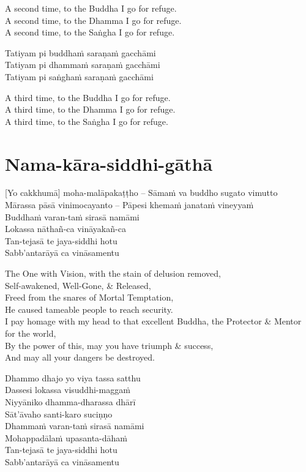 \begin{english-verses}
  A second time, to the Buddha I go for refuge.\\
  A second time, to the Dhamma I go for refuge.\\
  A second time, to the Saṅgha I go for refuge.
\end{english-verses}

Tatiyam pi buddhaṁ saraṇaṁ gacchāmi\\
Tatiyam pi dhammaṁ saraṇaṁ gacchāmi\\
Tatiyam pi saṅghaṁ saraṇaṁ gacchāmi

\begin{english-verses}
  A third time, to the Buddha I go for refuge.\\
  A third time, to the Dhamma I go for refuge.\\
  A third time, to the Saṅgha I go for refuge.
\end{english-verses}

\section{Nama-kāra-siddhi-gāthā}
\label{nama-kara-siddhi-gatha}
[Yo cakkhumā] moha-malāpakaṭṭho – Sāmaṁ va buddho sugato vimutto\\
Mārassa pāsā vinimocayanto – Pāpesi khemaṁ janataṁ vineyyaṁ\\
Buddhaṁ varan-taṁ sirasā namāmi\\
Lokassa nāthañ-ca vināyakañ-ca\\
Tan-tejasā te jaya-siddhi hotu\\
Sabb'antarāyā ca vināsamentu

\begin{english}
  The One with Vision, with the stain of delusion removed,\\
  Self-awakened, Well-Gone, \& Released,\\
  Freed from the snares of Mortal Temptation,\\
  He caused tameable people to reach security.\\
  I pay homage with my head to that excellent Buddha, the Protector \& Mentor for the world,\\
  By the power of this, may you have triumph \& success,\\
  And may all your dangers be destroyed.
\end{english}

Dhammo dhajo yo viya tassa satthu\\
Dassesi lokassa visuddhi-maggaṁ\\
Niyyāniko dhamma-dharassa dhārī\\
Sāt'āvaho santi-karo suciṇṇo\\
Dhammaṁ varan-taṁ sirasā namāmi\\
Mohappadālaṁ upasanta-dāhaṁ\\
Tan-tejasā te jaya-siddhi hotu\\
Sabb'antarāyā ca vināsamentu

